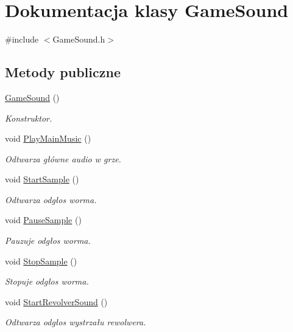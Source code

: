 \hypertarget{class_game_sound}{}\section{Dokumentacja klasy Game\+Sound}
\label{class_game_sound}


{\ttfamily \#include $<$Game\+Sound.\+h$>$}

\subsection*{Metody publiczne}
\begin{DoxyCompactItemize}
\item 
\mbox{\hyperlink{class_game_sound_a14feacd320c8a89e68cacf456920c8c1}{Game\+Sound}} ()
\begin{DoxyCompactList}\small\item\em Konstruktor. \end{DoxyCompactList}\item 
void \mbox{\hyperlink{class_game_sound_ad89f0cfad75194e895cb68437f9c231f}{Play\+Main\+Music}} ()
\begin{DoxyCompactList}\small\item\em Odtwarza główne audio w grze. \end{DoxyCompactList}\item 
void \mbox{\hyperlink{class_game_sound_a30db244babc1e4aa518bd56500cea028}{Start\+Sample}} ()
\begin{DoxyCompactList}\small\item\em Odtwarza odgłos worma. \end{DoxyCompactList}\item 
void \mbox{\hyperlink{class_game_sound_a9b64e35e47dd7f06876be460c9cbf67f}{Pause\+Sample}} ()
\begin{DoxyCompactList}\small\item\em Pauzuje odgłos worma. \end{DoxyCompactList}\item 
void \mbox{\hyperlink{class_game_sound_a819246ab2ca8154f7b8fa1b87cdd68ca}{Stop\+Sample}} ()
\begin{DoxyCompactList}\small\item\em Stopuje odgłos worma. \end{DoxyCompactList}\item 
void \mbox{\hyperlink{class_game_sound_a909e0c0bc44437ea2853e734ab548e5a}{Start\+Revolver\+Sound}} ()
\begin{DoxyCompactList}\small\item\em Odtwarza odgłos wystrzału rewolwera. \end{DoxyCompactList}\item 

\end{DoxyCompactItemize}
